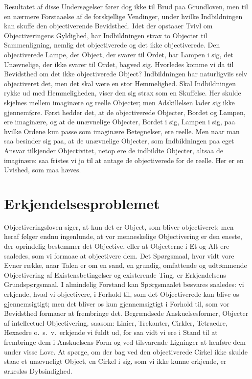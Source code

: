 \documentclass[12pt]{book}
\newcommand{\apage}[1]{\marginnote{\footnotesize\textit{[#1]}}}
\begin{document}
Resultatet af disse Undersøgelser fører dog ikke til Brud paa
Grundloven, men til en nærmere Forstaaelse af de forskjellige Vendinger,
under hvilke Indbildningen kan skuffe den objectiverende Bevidsthed.
Idet der opstaaer Tvivl om Objectiveringens Gyldighed, har Indbildningen
strax to Objecter til Sammenligning, nemlig det objectiverede og det
ikke objectiverede. Den objectiverede Lampe, det Object, der svarer til
Ordet, har Lampen i sig, det Unævnelige, der ikke svarer til Ordet,
bagved sig. Hvorledes komme vi da til Bevidsthed om det ikke
objectiverede Object? Indbildningen har naturligviis selv objectiveret
det, men det skal være en stor Hemmelighed. Skal Indbildningen rykke
ud med Hemmeligheden, viser den sig strax som en Skuffelse. Her skulde
skjelnes mellem imaginære og reelle Objecter; men Adskillelsen lader
sig ikke gjennemføre. Først hedder det, at de objectiverede Objecter,
Bordet og Lampen, ere imaginære, og at de unævnelige Objecter, Bordet
i sig, Lampen i sig, paa hvilke Ordene kun passe som imaginære
Betegnelser, ere reelle. Men naar man saa besinder sig paa, at de
unævnelige Objecter, som Indbildningen paa eget Ansvar tilkjender
Objectivitet, netop ere de indbildte Objecter, altsaa de imaginære:
saa fristes vi jo til at antage de objectiverede for de reelle. Her er
en Uvished, som maa hæves.

\section{Erkjendelsesproblemet} \apage{50} 
\label{sec:6}

\noindent Objectiveringsloven siger, at kun det er Object, som bliver
objectiveret; men heraf følger endnu ingenlunde, at vor menneskelige
Objectivering er den eneste, der oprindelig bestemmer det Objective, eller
at Objecterne i Et og Alt ere saaledes, som vi formaae at objectivere dem.
Det Spørgsmaal, hvor vidt vore Evner række, naar Talen er om en sand, en
grundig, omfattende og udtømmende Objectivering af Existensbetingelser og
existerende Ting, er Erkjendelsens Grundspørgsmaal. I almindelig Forstand
kan Spørgsmaalet besvares saaledes: vi erkjende, hvad vi objectivere, i
Forhold til, som det Objectiverede kan blive os gjennemsigtigt; men det
bliver os kun gjennemsigtigt i Forhold til, som vor Bevidsthed formaaer at
frembringe det. Begrændsede Anskuelsesformer, Objecter af intellectuel
Objectivering, saasom: Linier, Trekanter, Cirkler, Tetraedre, Hexaedre
o.\ s.\ v.\ erkjende vi fuldt ud, for saa vidt vi ere i Stand til at frembringe
dem i Anskuelsens Form og ved tilsvarende Ligninger at henføre dem under
visse Love. At spørge, om der bag ved den objectiverede Cirkel ikke skulde
staae et unævneligt Object, en Cirkel i sig, som vi ikke kunne erkjende,
er ørkesløs Dybsindighed.
\end{document}
